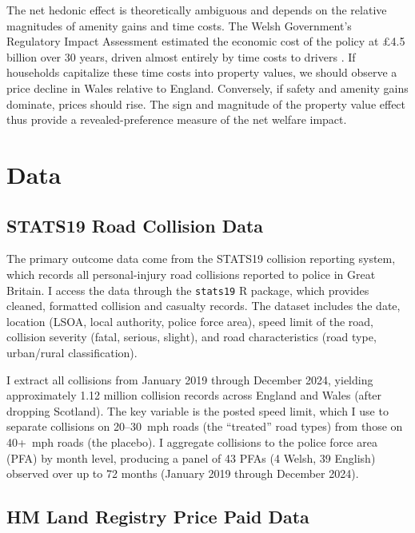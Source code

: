 \documentclass[12pt]{article}
\begin{document}
The net hedonic effect is theoretically ambiguous and depends on the relative magnitudes of amenity gains and time costs. The Welsh Government's Regulatory Impact Assessment estimated the economic cost of the policy at \pounds 4.5 billion over 30 years, driven almost entirely by time costs to drivers \citep{welshgov2022}. If households capitalize these time costs into property values, we should observe a price decline in Wales relative to England. Conversely, if safety and amenity gains dominate, prices should rise. The sign and magnitude of the property value effect thus provide a revealed-preference measure of the net welfare impact.


\section{Data}
\label{sec:data}

\subsection{STATS19 Road Collision Data}

The primary outcome data come from the STATS19 collision reporting system, which records all personal-injury road collisions reported to police in Great Britain. I access the data through the \texttt{stats19} R package, which provides cleaned, formatted collision and casualty records. The dataset includes the date, location (LSOA, local authority, police force area), speed limit of the road, collision severity (fatal, serious, slight), and road characteristics (road type, urban/rural classification).

I extract all collisions from January 2019 through December 2024, yielding approximately 1.12 million collision records across England and Wales (after dropping Scotland). The key variable is the posted speed limit, which I use to separate collisions on 20--30~mph roads (the ``treated'' road types) from those on 40+~mph roads (the placebo). I aggregate collisions to the police force area (PFA) by month level, producing a panel of 43 PFAs (4 Welsh, 39 English) observed over up to 72 months (January 2019 through December 2024).

\subsection{HM Land Registry Price Paid Data}
\end{document}
